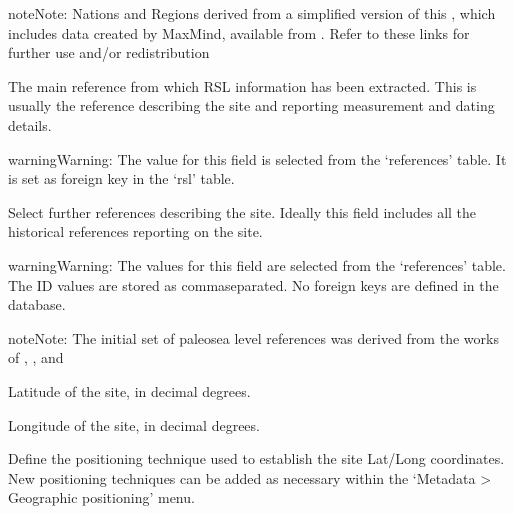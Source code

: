 \documentclass[letterpaper,10pt,english]{sphinxmanual}
\begin{document}
\begin{sphinxadmonition}{note}{Note:}
Nations and Regions derived from a simplified version of this , which includes data created by MaxMind, available from . Refer to these links for further use and/or redistribution
\end{sphinxadmonition}

 \sphinxhyphen{} The main reference from which RSL information has been extracted. This is usually the reference describing the site and reporting measurement and dating details.

\begin{sphinxadmonition}{warning}{Warning:}
The value for this field is selected from the ‘references’ table. It is set as foreign key in the ‘rsl’ table.
\end{sphinxadmonition}

 \sphinxhyphen{} Select further references describing the site. Ideally this field includes all the historical references reporting on the site.

\begin{sphinxadmonition}{warning}{Warning:}
The values for this field are selected from the ‘references’ table. The ID values are stored as comma\sphinxhyphen{}separated. No foreign keys are defined in the database.
\end{sphinxadmonition}

\begin{sphinxadmonition}{note}{Note:}
The initial set of paleo\sphinxhyphen{}sea level references was derived from the works of , , and 
\end{sphinxadmonition}

 \sphinxhyphen{} Latitude of the site, in decimal degrees.

 \sphinxhyphen{} Longitude of the site, in decimal degrees.

 \sphinxhyphen{} Define the positioning technique used to establish the site Lat/Long coordinates. New positioning techniques can be added as necessary within the ‘Metadata \sphinxhyphen{}\textgreater{} Geographic positioning’ menu.
\end{document}

